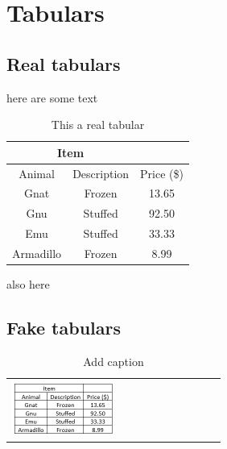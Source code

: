 \section{Tabulars}

\subsection{Real tabulars}

here are some text

\begin{table}[h]%
\centering
\begin{tabular}{|c|cc|}
\hline
\multicolumn{2}{|c|}{Item}                   & \multicolumn{1}{r|}{} \\ \hline
Animal    & \multicolumn{1}{c|}{Description} & Price (\$)            \\ \hline
Gnat      & \multicolumn{1}{c|}{Frozen}      & 13.65                 \\ \hline
Gnu       & \multicolumn{1}{c|}{Stuffed}     & 92.50                 \\ \hline
Emu       & \multicolumn{1}{c|}{Stuffed}     & 33.33                 \\ \hline
Armadillo & \multicolumn{1}{c|}{Frozen}      & 8.99                  \\ \hline
\end{tabular}
\caption{This a real tabular}
\label{my-label}
\end{table}

also here

\subsection{Fake tabulars}



\begin{table}[htbp]
  \centering
    \begin{tabular}{l}
    \includegraphics[width=0.5\textwidth]{Pictures/Tab}
    \end{tabular}%
  \caption{Add caption}
  \label{tab:addlabel}%
\end{table}%
